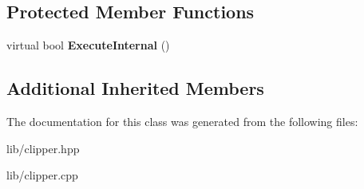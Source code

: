 \subsection*{Protected Member Functions}
\begin{DoxyCompactItemize}
\item 
\mbox{\label{class_clipper_lib_1_1_clipper_a3e8757e5f8a6ffcb7fd0f9630fde02d3}} 
virtual bool {\bfseries Execute\+Internal} ()
\end{DoxyCompactItemize}
\subsection*{Additional Inherited Members}


The documentation for this class was generated from the following files\+:\begin{DoxyCompactItemize}
\item 
lib/clipper.\+hpp\item 
lib/clipper.\+cpp\end{DoxyCompactItemize}

